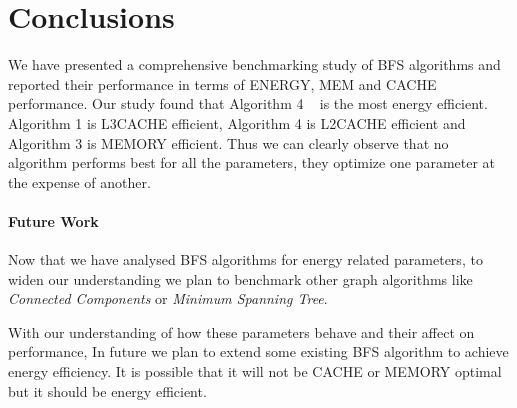 \section{Conclusions}
\label{conc}

%
%
%

We have presented a comprehensive benchmarking study of BFS algorithms
and reported their performance in terms of ENERGY, MEM and CACHE
performance.  Our study found that Algorithm 4 ~\cite{LIGRA-BFS} is the most
energy efficient.  Algorithm 1 is L3CACHE efficient, Algorithm 4 is L2CACHE
efficient and Algorithm 3 is MEMORY efficient.  Thus we can clearly observe
that no algorithm performs best for all the parameters, they optimize
one parameter at the expense of another.


\paragraph{Future Work}
Now that we have analysed BFS algorithms for energy related
parameters, to widen our understanding we plan to benchmark other
graph algorithms like \emph{Connected Components} or \emph{Minimum
Spanning Tree}.

With our understanding of how these parameters behave and their affect
on performance, In future we plan to extend some existing BFS
algorithm to achieve energy efficiency.  It is possible that it will
not be CACHE or MEMORY optimal but it should be energy efficient.


%
%
%
%
%
%
%

